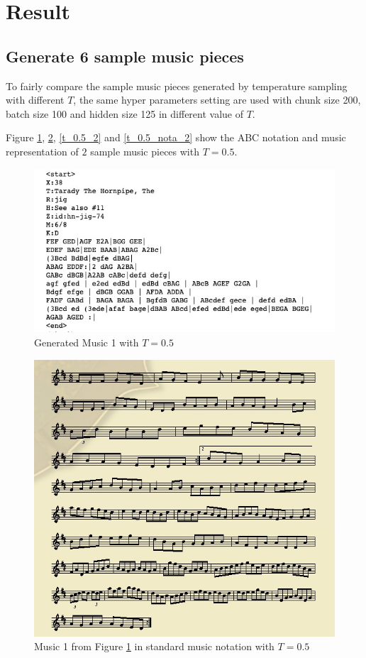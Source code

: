 \documentclass{article}
\begin{document}
\section{Result}
\subsection{Generate 6 sample music pieces}

To fairly compare the sample music pieces generated by temperature sampling with different $T$, the same hyper parameters setting are used with chunk size 200, batch size 100 and hidden size 125 in different value of $T$.

Figure \ref{t_0.5_1}, \ref{t_0.5_nota_1}, \ref{t_0.5_2} and \ref{t_0.5_nota_2} show the ABC notation and music representation of $2$ sample music pieces with $T=0.5$.

\begin{figure}[H]
\begin{center}
  \centering
  \includegraphics[width=5in]{image/t_05_1.png}
\end{center}
\caption{Generated Music 1 with $T=0.5$}
\label{t_0.5_1}
\end{figure}

\begin{figure}[H]
\begin{center}
  \centering
  \includegraphics[width=4.5in]{image/t_05_1_nota.png}
\end{center}
\caption{Music 1 from Figure \ref{t_0.5_1} in standard music notation with $T=0.5$}
\label{t_0.5_nota_1}
\end{figure}
\end{document}
